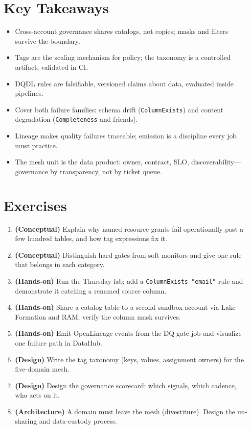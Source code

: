 \section*{Key Takeaways}
\begin{itemize}
    \item Cross-account governance shares catalogs, not copies; masks and filters survive the boundary.
    \item Tags are the scaling mechanism for policy; the taxonomy is a controlled artifact, validated in CI.
    \item DQDL rules are falsifiable, versioned claims about data, evaluated inside pipelines.
    \item Cover both failure families: schema drift (\texttt{ColumnExists}) and content degradation (\texttt{Completeness} and friends).
    \item Lineage makes quality failures traceable; emission is a discipline every job must practice.
    \item The mesh unit is the data product: owner, contract, SLO, discoverability---governance by transparency, not by ticket queue.
\end{itemize}

\section{Exercises}
\begin{enumerate}
    \item \textbf{(Conceptual)} Explain why named-resource grants fail operationally past a few hundred tables, and how tag expressions fix it.
    \item \textbf{(Conceptual)} Distinguish hard gates from soft monitors and give one rule that belongs in each category.
    \item \textbf{(Hands-on)} Run the Thursday lab; add a \texttt{ColumnExists "email"} rule and demonstrate it catching a renamed source column.
    \item \textbf{(Hands-on)} Share a catalog table to a second sandbox account via Lake Formation and RAM; verify the column mask survives.
    \item \textbf{(Hands-on)} Emit OpenLineage events from the DQ gate job and visualize one failure path in DataHub.
    \item \textbf{(Design)} Write the tag taxonomy (keys, values, assignment owners) for the five-domain mesh.
    \item \textbf{(Design)} Design the governance scorecard: which signals, which cadence, who acts on it.
    \item \textbf{(Architecture)} A domain must leave the mesh (divestiture). Design the un-sharing and data-custody process.
\end{enumerate}

